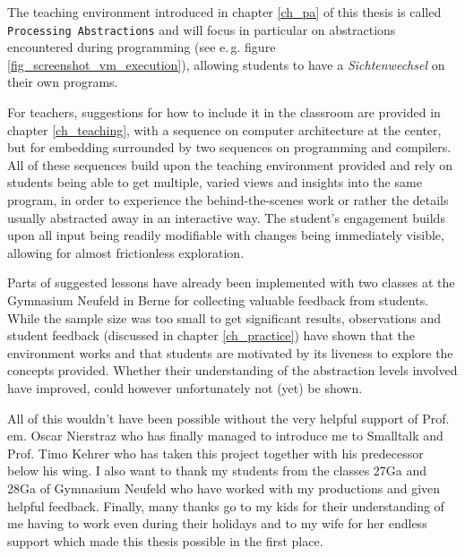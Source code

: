 The teaching environment introduced in chapter \ref{ch_pa} of this thesis is called \texttt{Processing Abstractions} and will focus in particular on abstractions encountered during programming (see e.\,g. figure \ref{fig_screenshot_vm_execution}), allowing students to have a \emph{Sichtenwechsel} on their own programs.

For teachers, suggestions for how to include it in the classroom are provided in chapter \ref{ch_teaching}, with a sequence on computer architecture at the center, but for embedding surrounded by two sequences on programming and compilers. All of these sequences build upon the teaching environment provided and rely on students being able to get multiple, varied views and insights into the same program, in order to experience the behind-the-scenes work or rather the details usually abstracted away in an interactive way. The student's engagement builds upon all input being readily modifiable with changes being immediately visible, allowing for almost frictionless exploration.

Parts of suggested lessons have already been implemented with two classes at the Gymnasium Neufeld in Berne for collecting valuable feedback from students. While the sample size was too small to get significant results, observations and student feedback (discussed in chapter \ref{ch_practice}) have shown that the environment works and that students are motivated by its liveness to explore the concepts provided. Whether their understanding of the abstraction levels involved have improved, could however unfortunately not (yet) be shown.

All of this wouldn't have been possible without the very helpful support of Prof.\,em. Oscar Nierstraz who has finally managed to introduce me to Smalltalk and Prof. Timo Kehrer who has taken this project together with his predecessor below his wing. I also want to thank my students from the classes 27Ga and 28Ga of Gymnasium Neufeld who have worked with my productions and given helpful feedback. Finally, many thanks go to my kids for their understanding of me having to work even during their holidays and to my wife for her endless support which made this thesis possible in the first place.
